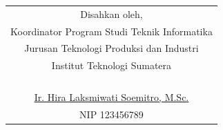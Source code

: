 \begin{center}
	\centering 
	\begin{tabular}{c}
		Disahkan oleh,\\
		Koordinator Program Studi Teknik Informatika\\
		Jurusan Teknologi Produksi dan Industri\\
		Institut Teknologi Sumatera
		\\
		\\
		\\
		\\
		\\
		\underline{Ir. Hira Laksmiwati Soemitro, M.Sc.} \\
		NIP 123456789 \\
	\end{tabular}
	
\end{center}
\clearpage
